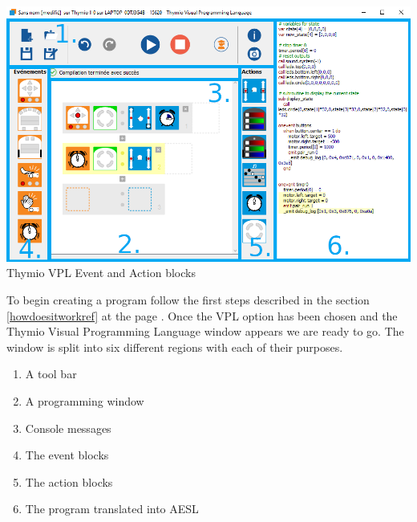 \documentclass{scrartcl}
\begin{document}
\begin{center}
  \includegraphics[width=\textwidth]{./VPL/Thymio_VPL_window}\\
  Thymio VPL Event and Action blocks
\end{center}

To begin creating a program follow the first steps described in the section \ref{howdoesitworkref} at the page \pageref{howdoesitworkref}. 
Once the VPL option has been chosen and the Thymio Visual Programming Language window appears we are ready to go. 
The window is split into six different regions with each of their purposes.
\begin{enumerate}
  \item A tool bar
  \item A programming window
  \item Console messages
  \item The event blocks
  \item The action blocks
  \item The program translated into AESL
\end{enumerate}
\end{document}
